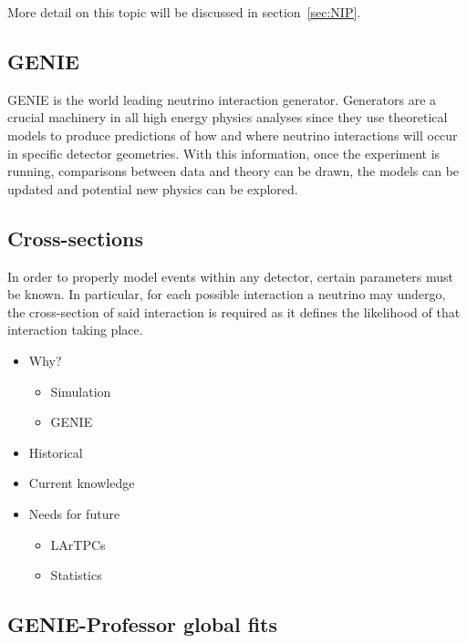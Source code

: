 More detail on this topic will be discussed in section~\ref{sec:NIP}.

\subsection{GENIE}

    GENIE is the world leading neutrino interaction generator. Generators are a crucial machinery in all high energy physics analyses since they use theoretical models to produce predictions of how and where neutrino interactions will occur in specific detector geometries. With this information, once the experiment is running, comparisons between data and theory can be drawn, the models can be updated and potential new physics can be explored.

\subsection{Cross-sections}
   
    In order to properly model events within any detector, certain parameters must be known. In particular, for each possible interaction a neutrino may undergo, the cross-section of said interaction is required as it defines the likelihood of that interaction taking place. 
    
    \begin{itemize}

        \item Why?
        
        \begin{itemize}

            \item Simulation
            \item GENIE

        \end{itemize}
        
        \item Historical
        \item Current knowledge
        \item Needs for future
        
        \begin{itemize}

            \item LArTPCs
            \item Statistics

        \end{itemize}

    \end{itemize}

\subsection{GENIE-Professor global fits}


\clearpage
